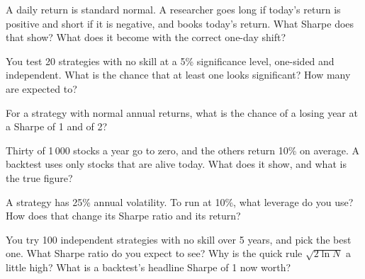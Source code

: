 \begin{question}\label{iq:iv2:research-and-strategy-cases:6}
A daily return is standard normal. A researcher goes long if today's return is positive and short if it is negative, and books today's return. What Sharpe does that show? What does it become with the correct one-day shift?
\end{question}

\begin{question}\label{iq:iv2:research-and-strategy-cases:7}
You test 20 strategies with no skill at a 5\% significance level, one-sided and independent. What is the chance that at least one looks significant? How many are expected to?
\end{question}

\begin{question}\label{iq:iv2:research-and-strategy-cases:8}
For a strategy with normal annual returns, what is the chance of a losing year at a Sharpe of 1 and of 2?
\end{question}

\begin{question}\label{iq:iv2:research-and-strategy-cases:9}
Thirty of 1\,000 stocks a year go to zero, and the others return 10\% on average. A backtest uses only stocks that are alive today. What does it show, and what is the true figure?
\end{question}

\begin{question}\label{iq:iv2:research-and-strategy-cases:10}
A strategy has 25\% annual volatility. To run at 10\%, what leverage do you use? How does that change its Sharpe ratio and its return?
\end{question}

\begin{question}\label{iq:iv2:research-and-strategy-cases:11}
You try 100 independent strategies with no skill over 5 years, and pick the best one. What Sharpe ratio do you expect to see? Why is the quick rule $\sqrt{2\ln N}$ a little high? What is a backtest's headline Sharpe of 1 now worth?
\end{question}

